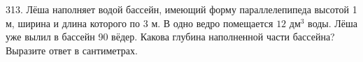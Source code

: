 313. Лёша наполняет водой бассейн, имеющий форму параллелепипеда высотой 1 м, ширина и длина которого по 3 м. В одно ведро помещается $12\text{ дм}^3$ воды. Лёша уже вылил в бассейн 90 вёдер. Какова глубина наполненной части бассейна? Выразите ответ в сантиметрах.\\
